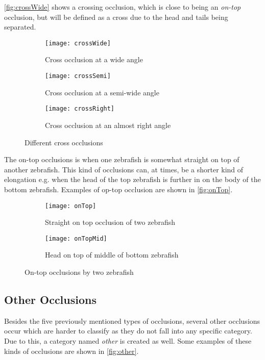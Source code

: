 \autoref{fig:crossWide} shows a crossing occlusion, which is close to being an \textit{on-top} occlusion, but will be defined as a cross due to the head and tails being separated.

\begin{figure}[H]
	\centering
	\begin{subfigure}[b]{0.3\textwidth}
		\texttt{[image: crossWide]}
		\caption{Cross occlusion at a wide angle}
		\label{fig:crossWide}
	\end{subfigure}
	\begin{subfigure}[b]{0.3\textwidth}
		\texttt{[image: crossSemi]}
		\caption{Cross occlusion at a semi-wide angle}
		\label{fig:crossSemi}
	\end{subfigure}
	\begin{subfigure}[b]{0.3\textwidth}
		\texttt{[image: crossRight]}
		\caption{Cross occlusion at an almost right angle}
		\label{fig:crossRight}
	\end{subfigure}
	\caption{Different cross occlusions}
	\label{fig:cross}
\end{figure}

The on-top occlusions is when one zebrafish is somewhat straight on top of another zebrafish. This kind of occlusions can, at times, be a shorter kind of elongation e.g. when the head of the top zebrafish is further in on the body of the bottom zebrafish. Examples of op-top occlusion are shown in \autoref{fig:onTop}.

\begin{figure}[H]
	\centering
	\begin{subfigure}[b]{0.47\textwidth}
		\texttt{[image: onTop]}
		\caption{Straight on top occlusion of two zebrafish}
		\label{fig:onTopFull}
	\end{subfigure}
	\begin{subfigure}[b]{0.47\textwidth}
		\texttt{[image: onTopMid]}
		\caption{Head on top of middle of bottom zebrafish}
		\label{fig:onTopMid}
	\end{subfigure}
	\caption{On-top occlusions by two zebrafish}
	\label{fig:onTop}
\end{figure}

\subsection{Other Occlusions}
Besides the five previously mentioned types of occlusions, several other occlusions occur which are harder to classify as they do not fall into any specific category. Due to this, a category named \textit{other} is created as well. Some examples of these kinds of occlusions are shown in \autoref{fig:other}.

